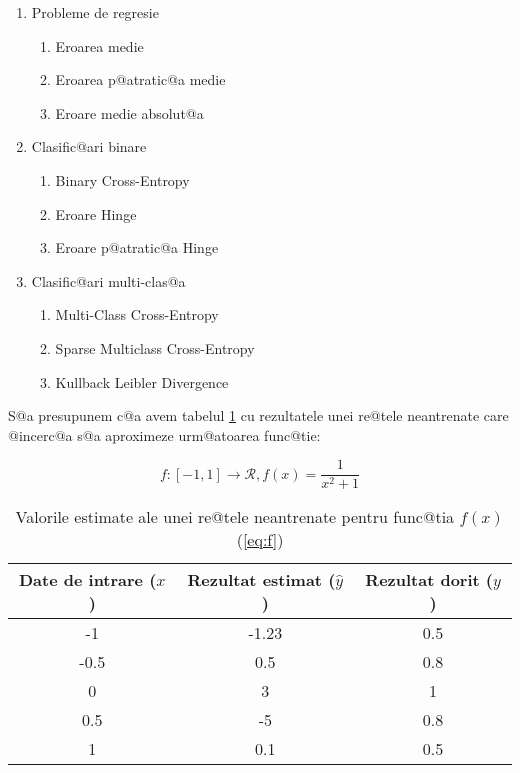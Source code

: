 \begin{enumerate}
	\item Probleme de regresie
	\begin{enumerate}
		\item Eroarea medie
		\item Eroarea p@atratic@a medie
		\item Eroare medie absolut@a
	\end{enumerate}
	\item Clasific@ari binare
	\begin{enumerate}
		\item Binary Cross-Entropy
		\item Eroare Hinge
		\item Eroare p@atratic@a Hinge
	\end{enumerate}
	\item Clasific@ari multi-clas@a
	\begin{enumerate}
		\item Multi-Class Cross-Entropy
		\item Sparse Multiclass Cross-Entropy
		\item Kullback Leibler Divergence
	\end{enumerate}
\end{enumerate}

S@a presupunem c@a avem tabelul \ref{tab:nn-functie} cu rezultatele unei re@tele neantrenate care @incerc@a s@a aproximeze urm@atoarea func@tie:

\begin{equation} \label{eq:f}
	f:[-1, 1]\rightarrow \mathcal{R}, f(x) = \displaystyle\frac{1}{x^2+1}
\end{equation}

\begin{table}[h]
	\begin{center}
		\begin{tabular}{|c|c|c|}
			\hline
			Date de intrare ($x$) & Rezultat estimat ($\hat{y}$) & Rezultat dorit ($y$) \\
			\hline
			-1 & -1.23 & 0.5 \\
			\hline
			-0.5 & 0.5 & 0.8 \\
			\hline
			0 & 3 & 1 \\
			\hline
			0.5 & -5 & 0.8 \\ 
			\hline
			1 & 0.1 & 0.5 \\ 
			\hline
		\end{tabular}
	\end{center}
	\caption{Valorile estimate ale unei re@tele neantrenate pentru func@tia $f(x)$ (\ref{eq:f})}
	\label{tab:nn-functie}
\end{table}


